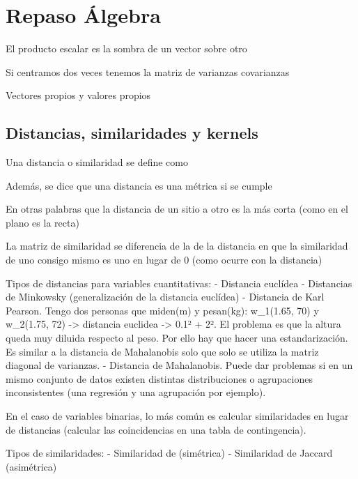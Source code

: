 \section{Repaso Álgebra}
El producto escalar es la sombra de un vector sobre otro

Si centramos dos veces tenemos la matriz de varianzas covarianzas

Vectores propios y valores propios

\subsection{Distancias, similaridades y kernels}
Una distancia o similaridad se define como

Además, se dice que una distancia es una métrica si se cumple

En otras palabras que la distancia de un sitio a otro es la más corta (como en el plano es la recta)

La matriz de similaridad se diferencia de la de la distancia en que la similaridad de uno consigo mismo es uno en lugar de 0 (como ocurre con la distancia)

Tipos de distancias para variables cuantitativas:
- Distancia euclídea
- Distancias de Minkowsky (generalización de la distancia euclídea)
- Distancia de Karl Pearson. Tengo dos personas que miden(m) y pesan(kg): w_1(1.65, 70) y w_2(1.75, 72) -> distancia euclidea -> 0.1² + 2². El problema es que la altura queda muy diluida respecto al peso. Por ello hay que hacer una estandarización. Es similar a la distancia de Mahalanobis solo que solo se utiliza la matriz diagonal de varianzas.
- Distancia de Mahalanobis. Puede dar problemas si en un mismo conjunto de datos existen  distintas distribuciones o agrupaciones inconsistentes (una regresión y una agrupación por ejemplo).


En el caso de variables binarias, lo más común es calcular similaridades en lugar de distancias (calcular las coincidencias en una tabla de contingencia).

Tipos de similaridades:
- Similaridad de (simétrica)
- Similaridad de Jaccard (asimétrica)


